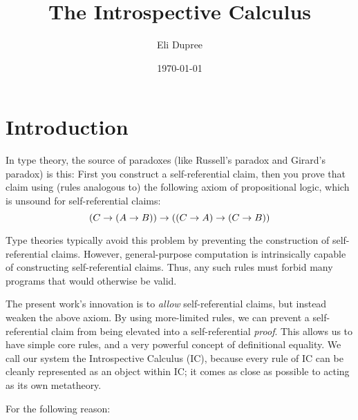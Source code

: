 \documentclass{article}
\title{The Introspective Calculus}
\author{Eli Dupree}
\date{\today}
\begin{document}
  \maketitle
  
  \section{Introduction}
  
  
  In type theory, the source of paradoxes (like Russell's paradox and Girard's paradox) is this: First you construct a self-referential claim, then you prove that claim using (rules analogous to) the following axiom of propositional logic, which is unsound for self-referential claims:
  \begin{equation*}
    \label{unsoundaxiom}
    (C \to (A \to B)) \to ((C \to A) \to (C \to B))
    \vspace{0.8em}
  \end{equation*}
  
  Type theories typically avoid this problem by preventing the construction of self-referential claims.
  However, general-purpose computation is intrinsically capable of constructing self-referential claims.
  Thus, any such rules must forbid many programs that would otherwise be valid.

  The present work's innovation is to \emph{allow} self-referential claims, but instead weaken the above axiom.
  By using more-limited rules, we can prevent a self-referential claim from being elevated into a self-referential \emph{proof}.
  This allows us to have simple core rules, and a very powerful concept of definitional equality.
  We call our system the Introspective Calculus (IC), because every rule of IC can be cleanly represented as an object within IC; it comes as close as possible to acting as its own metatheory.
  
  \iffalse
  For the following reason:
  
\end{document}

